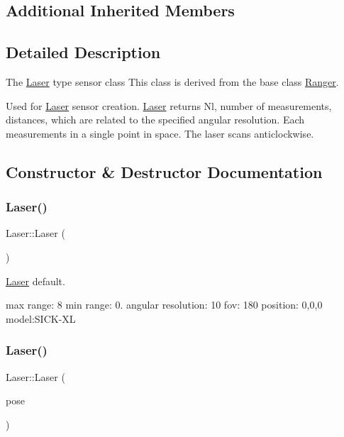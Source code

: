 \subsection*{Additional Inherited Members}


\subsection{Detailed Description}
The \hyperlink{classLaser}{Laser} type sensor class This class is derived from the base class \hyperlink{classRanger}{Ranger}. 

Used for \hyperlink{classLaser}{Laser} sensor creation. \hyperlink{classLaser}{Laser} returns Nl, number of measurements, distances, which are related to the specified angular resolution. Each measurements in a single point in space. The laser scans anticlockwise. 

\subsection{Constructor \& Destructor Documentation}
\mbox{\label{classLaser_a68465e89283dffcc29a37e94693c6f87}} 
\subsubsection{\texorpdfstring{Laser()}{Laser()}\hspace{0.1cm}{\footnotesize\ttfamily [1/3]}}
{\footnotesize\ttfamily Laser\+::\+Laser (\begin{DoxyParamCaption}{ }\end{DoxyParamCaption})}



\hyperlink{classLaser}{Laser} default. 

max range\+: 8 min range\+: 0. angular resolution\+: 10 fov\+: 180 position\+: 0,0,0 model\+:S\+I\+C\+K-\/\+XL \mbox{\label{classLaser_abb99761eebf2ed73ab2fe3333c69dcdf}} 
\subsubsection{\texorpdfstring{Laser()}{Laser()}\hspace{0.1cm}{\footnotesize\ttfamily [2/3]}}
{\footnotesize\ttfamily Laser\+::\+Laser (\begin{DoxyParamCaption}\item[{\hyperlink{structranger_1_1SensorPose}{ranger\+::\+Sensor\+Pose}}]{pose }\end{DoxyParamCaption})}



